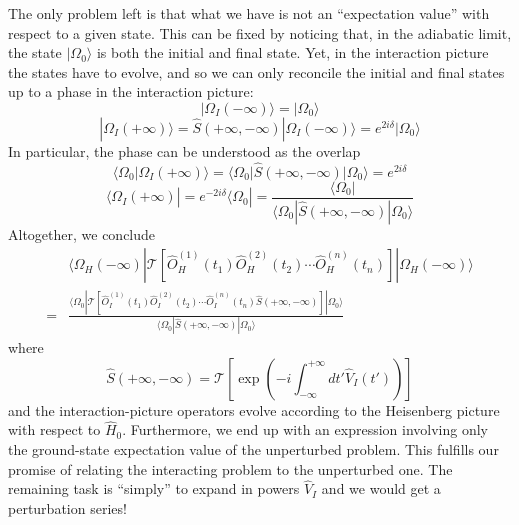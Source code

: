 The only problem left is that what we have is not an ``expectation value'' with respect to a given state. This can be fixed by noticing that, in the adiabatic limit, the state $|\Omega_0\rangle$ is both the initial and final state. Yet, in the interaction picture the states have to evolve, and so we can only reconcile the initial and final states up to a phase in the interaction picture:
\[ |\Omega _I\left( -\infty \right) \rangle =|\Omega _0\rangle \]
\[ |\Omega _I\left( +\infty \right) \rangle =\hat{S}\left( +\infty ,-\infty \right) |\Omega _I\left( -\infty \right) \rangle =e^{2i\delta}|\Omega _0\rangle \]
In particular, the phase can be understood as the overlap
\[ \langle \Omega _0|\Omega _I\left( +\infty \right) \rangle =\langle \Omega _0|\hat{S}\left( +\infty ,-\infty \right) |\Omega _0\rangle =e^{2i\delta}\]
\[ \langle \Omega _I\left( +\infty \right) |=e^{-2i\delta}\langle \Omega _0|=\frac{\langle \Omega _0|}{\langle \Omega _0|\hat{S}\left( +\infty ,-\infty \right) |\Omega _0\rangle}\]
Altogether, we conclude
\begin{align*}
    &\langle \Omega _H\left( -\infty \right) |\mathcal{T} \left[ \hat{O}_{H}^{\left( 1 \right)}\left( t_1 \right) \hat{O}_{H}^{\left( 2 \right)}\left( t_2 \right) \cdots \hat{O}_{H}^{\left( n \right)}\left( t_n \right) \right] |\Omega _H\left( -\infty \right) \rangle \\
    =&\frac{\langle \Omega _0|\mathcal{T} \left[ \hat{O}_{I}^{\left( 1 \right)}\left( t_1 \right) \hat{O}_{I}^{\left( 2 \right)}\left( t_2 \right) \cdots \hat{O}_{I}^{\left( n \right)}\left( t_n \right) \hat{S}\left( +\infty ,-\infty \right) \right] |\Omega _0\rangle}{\langle \Omega _0|\hat{S}\left( +\infty ,-\infty \right) |\Omega _0\rangle}
\end{align*}
where
\[ \hat{S}\left( +\infty ,-\infty \right) =\mathcal{T} \left[ \exp \left( -i\int_{-\infty}^{+\infty}{dt'\hat{V}_I\left( t' \right)} \right) \right] \]
and the interaction-picture operators evolve according to the Heisenberg picture with respect to $\hat{H}_0$. Furthermore, we end up with an expression involving only the ground-state expectation value of the unperturbed problem. This fulfills our promise of relating the interacting problem to the unperturbed one. The remaining task is ``simply'' to expand in powers $\hat{V}_I$ and we would get a perturbation series!

